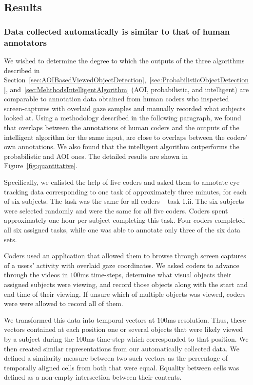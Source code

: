 \subsection{Results}
\subsubsection{Data collected automatically is similar to that of human annotators}
\label{sec:EvalResults}


We wished to determine the degree to which the outputs of the three algorithms described in Section~\ref{sec:AOIBasedViewedObjectDetection},~\ref{sec:ProbabilisticObjectDetection}, and~\ref{sec:MehthodsIntelligentAlgorithm} (AOI, probabilistic, and intelligent) are comparable to annotation data obtained from human coders who inspected screen-captures with overlaid gaze samples and manually recorded what subjects looked at. Using a methodology described in the following paragraph, we found that overlaps between the annotations of human coders and the outputs of the intelligent algorithm for the same input, are close to overlaps between the coders' own annotations. We also found that the intelligent algorithm outperforms the probabilistic and AOI ones. The detailed results are shown in Figure~\ref{fig:quantitative}.

Specifically, we enlisted the help of five coders and asked them to annotate eye-tracking data corresponding to one task of approximately three minutes, for each of six subjects.  The task was the same for all coders – task 1.ii. The six subjects were selected randomly and were the same for all five coders. Coders spent approximately one hour per subject completing this task. Four coders completed all six assigned tasks, while one was able to annotate only three of the six data sets. 

Coders used an application that allowed them to browse through screen captures of a users' activity with overlaid gaze coordinates. We asked coders to advance through the videos in $100$ms time-steps, determine what visual objects their assigned subjects were viewing, and record those objects along with the start and end time of their viewing. If unsure which of multiple objects was viewed, coders were were allowed to record all of them.  

We transformed this data into temporal vectors at $100$ms resolution. Thus, these vectors contained at each position one or several objects that were likely viewed by a subject during the $100$ms time-step which corresponded to that position. We then created similar representations from our automatically collected data. We defined a similarity measure between two such vectors as the percentage of temporally aligned cells from both that were equal. Equality between cells was defined as a non-empty intersection between their contents. 

